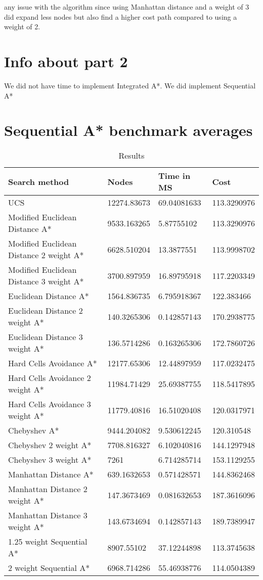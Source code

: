 \documentclass[11pt]{article} %
\begin{document}
any issue with the algorithm since using Manhattan distance and a weight of 3 did expand less nodes but also find a higher cost path compared to using a weight of 2.

\section{Info about part 2}
We did not have time to implement Integrated A*. We did implement Sequential A*
\pagebreak
\section{Sequential A* benchmark averages}
\begin{table}[htbp]
  \centering
  \caption{Results}
    \begin{tabular}{|l|l|l|l|}
	\hline
        Search method  &  Nodes & Time in MS & Cost \\
\hline
    UCS   & 12274.83673 & 69.04081633 & 113.3290976 \\
\hline
    Modified Euclidean Distance A* & 9533.163265 & 5.87755102 & 113.3290976 \\
\hline    Modified Euclidean Distance 2 weight A* & 6628.510204 & 13.3877551 & 113.9998702 \\
\hline    Modified Euclidean Distance 3 weight A* & 3700.897959 & 16.89795918 & 117.2203349 \\
\hline    Euclidean Distance A* & 1564.836735 & 6.795918367 & 122.383466 \\
\hline    Euclidean Distance 2 weight A* & 140.3265306 & 0.142857143 & 170.2938775 \\
\hline    Euclidean Distance 3 weight A* & 136.5714286 & 0.163265306 & 172.7860726 \\
\hline    Hard Cells Avoidance A* & 12177.65306 & 12.44897959 & 117.0232475 \\
\hline    Hard Cells Avoidance 2 weight A* & 11984.71429 & 25.69387755 & 118.5417895 \\
\hline    Hard Cells Avoidance 3 weight A* & 11779.40816 & 16.51020408 & 120.0317971 \\
\hline    Chebyshev A* & 9444.204082 & 9.530612245 & 120.310548 \\
\hline    Chebyshev 2 weight A* & 7708.816327 & 6.102040816 & 144.1297948 \\
\hline    Chebyshev 3 weight A* & 7261  & 6.714285714 & 153.1129255 \\
\hline    Manhattan Distance A* & 639.1632653 & 0.571428571 & 144.8362468 \\
\hline    Manhattan Distance 2 weight A* & 147.3673469 & 0.081632653 & 187.3616096 \\
\hline    Manhattan Distance 3 weight A* & 143.6734694 & 0.142857143 & 189.7389947 \\
\hline 1.25 weight Sequential A* & 8907.55102 & 37.12244898 & 113.3745638 \\
  \hline  2 weight Sequential A* & 6968.714286 & 55.46938776   & 114.0504389\\
\hline
    \end{tabular}%
  \label{tab:addlabel}%
\end{table}%
\end{document}
